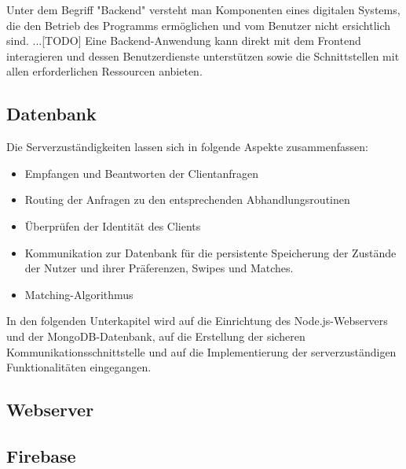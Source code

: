 Unter dem Begriff "Backend" versteht man Komponenten eines digitalen Systems, die den Betrieb des Programms ermöglichen und vom Benutzer nicht ersichtlich sind. ...[TODO]
\newline
Eine Backend-Anwendung kann direkt mit dem Frontend interagieren und dessen Benutzerdienste unterstützen sowie die Schnittstellen mit allen erforderlichen Ressourcen anbieten.

\subsection{Datenbank}


Die Serverzuständigkeiten lassen sich in folgende Aspekte zusammenfassen:
\begin{itemize}
\item Empfangen und Beantworten der Clientanfragen
\item Routing der Anfragen zu den entsprechenden Abhandlungsroutinen
\item Überprüfen der Identität des Clients
\item Kommunikation zur Datenbank für die persistente Speicherung der Zustände der Nutzer und ihrer Präferenzen, Swipes und Matches.
\item Matching-Algorithmus
\end{itemize} 

In den folgenden Unterkapitel wird auf die Einrichtung des Node.js-Webservers und der MongoDB-Datenbank, auf die Erstellung der sicheren Kommunikationsschnittstelle und auf die Implementierung der serverzuständigen Funktionalitäten eingegangen.

\subsection{Webserver}




\subsection{Firebase}
\label{sec:implementierung_firebase}

